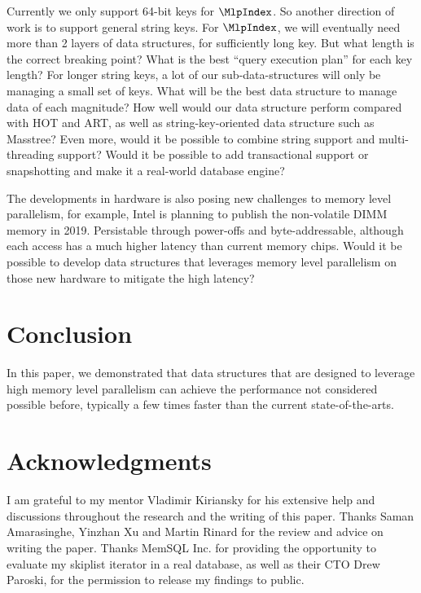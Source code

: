 \documentclass[11pt, usletter]{article}
\begin{document}
Currently we only support 64-bit keys for $\MlpIndex$. 
So another direction of work is to support general string keys. 
For $\MlpIndex$, we will eventually need more than 2 layers of data structures, 
for sufficiently long key. But what length is the correct breaking point?
What is the best ``query execution plan'' for each key length?
For longer string keys, a lot of our sub-data-structures will only be managing a small set of keys. 
What will be the best data structure to manage data of each magnitude? 
How well would our data structure perform compared with HOT and ART, 
as well as string-key-oriented data structure such as Masstree?
Even more, would it be possible to combine string support and multi-threading support?
Would it be possible to add transactional support or snapshotting and make it a 
real-world database engine? 

The developments in hardware is also posing new challenges to memory level parallelism, 
for example, Intel is planning to publish the non-volatile DIMM memory in 2019.
Persistable through power-offs and byte-addressable, 
although each access has a much higher latency than current memory chips. 
Would it be possible to develop data structures that leverages memory level parallelism 
on those new hardware to mitigate the high latency? 

\section{Conclusion} \label{conclusion}

In this paper, we demonstrated that data structures that are designed to leverage high memory level parallelism 
can achieve the performance not considered possible before, 
typically a few times faster than the current state-of-the-arts. 

\section*{Acknowledgments}

I am grateful to my mentor Vladimir Kiriansky for his extensive help and discussions throughout the research 
and the writing of this paper. Thanks Saman Amarasinghe, Yinzhan Xu and Martin Rinard for the review and advice on writing the paper. 
Thanks MemSQL Inc. for providing the opportunity to evaluate my skiplist iterator in a real database, 
as well as their CTO Drew Paroski, for the permission to release my findings to public.

{}

\end{document}
